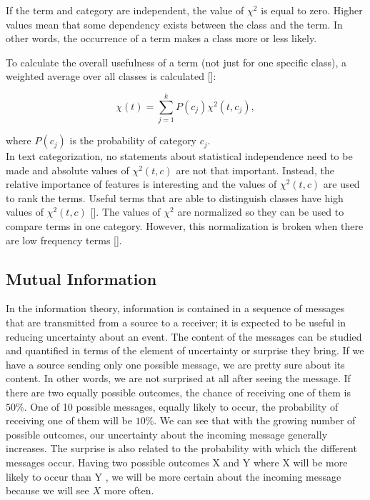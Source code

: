 If the term and category are independent, the value of $\chi^{2}$ is equal to zero. Higher values mean that some dependency exists between the class and the term. In other words, the occurrence of a term makes a class more or less likely.

To calculate the overall usefulness of a term (not just for one specific class), a weighted average over all classes is calculated [\cite{ref82}]:


\begin{equation*}
\chi(t)=\sum_{j=1}^{k} P\left(c_{j}\right) \chi^{2}\left(t, c_{j}\right), \tag{14.4}
\end{equation*}


where $P\left(c_{j}\right)$ is the probability of category $c_{j}$.\\
In text categorization, no statements about statistical independence need to be made and absolute values of $\chi^{2}(t, c)$ are not that important. Instead, the relative importance of features is interesting and the values of $\chi^{2}(t, c)$ are used to rank the terms. Useful terms that are able to distinguish classes have high values of $\chi^{2}(t, c)$ [\cite{ref185}]. The values of $\chi^{2}$ are normalized so they can be used to compare terms in one category. However, this normalization is broken when there are low frequency terms [\cite{ref286}].

\subsection{Mutual Information}
In the information theory, information is contained in a sequence of messages that are transmitted from a source to a receiver; it is expected to be useful in reducing uncertainty about an event. The content of the messages can be studied and quantified in terms of the element of uncertainty or surprise they bring. If we have a source sending only one possible message, we are pretty sure about its content. In other words, we are not surprised at all after seeing the message. If there are two equally possible outcomes, the chance of receiving one of them is $50 \%$. One of 10 possible messages, equally likely to occur, the probability of receiving one of them will be $10 \%$. We can see that with the growing number of possible outcomes, our uncertainty about the incoming message generally increases. The surprise is also related to the probability with which the different messages occur. Having two possible outcomes X and Y where X will be more likely to occur than Y , we will be more certain about the incoming message because we will see $X$ more often.

